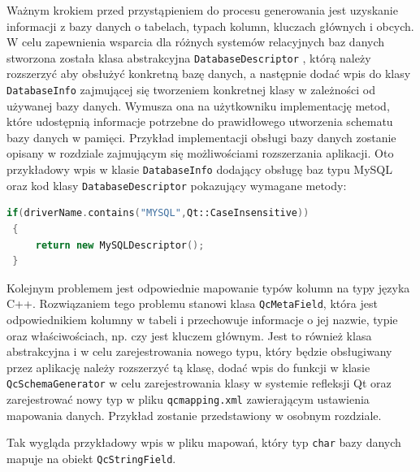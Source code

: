\documentclass[12pt]{report}
\let\oldaddcontentsline\addcontentsline
\newcommand{\lstinputcplusplus}[2][]{{%
  \renewcommand{\lstlistingname}{C++ Code}%
  \renewcommand{\addcontentsline}[3]{\oldaddcontentsline{loc}{##2}{##3}}%
}}
\begin{document}
Ważnym krokiem przed przystąpieniem do procesu generowania jest uzyskanie informacji z bazy danych o tabelach, typach kolumn, kluczach głównych i obcych. W celu zapewnienia wsparcia dla różnych systemów relacyjnych baz danych stworzona została klasa abstrakcyjna {\tt DatabaseDescriptor} , którą należy rozszerzyć aby obsłużyć konkretną bazę danych, a następnie dodać wpis do klasy {\tt DatabaseInfo} zajmującej się tworzeniem konkretnej klasy w zależności od używanej bazy danych. Wymusza ona na użytkowniku implementację metod, które udostępnią informacje potrzebne do prawidłowego utworzenia schematu bazy danych w pamięci. {\color{black} Przykład implementacji obsługi bazy danych zostanie opisany w rozdziale zajmującym się możliwościami rozszerzania aplikacji.} Oto przykładowy wpis w klasie {\tt DatabaseInfo} dodający obsługę baz typu MySQL oraz kod klasy {\tt DatabaseDescriptor} pokazujący wymagane metody:

\begin{framed}
\begin{lstlisting}[language=C++]
 if(driverName.contains("MYSQL",Qt::CaseInsensitive)) 
 {
     return new MySQLDescriptor();
 }
\end{lstlisting}
\end{framed}

\begin{framed}
\lstinputcplusplus[caption={DatabaseDescriptor}]{additional/databasedescriptor.h}
\end{framed}

Kolejnym problemem jest odpowiednie mapowanie typów kolumn na typy języ\-ka C++. Rozwiązaniem tego problemu stanowi klasa {\tt QcMetaField}, która jest odpowiednikiem kolumny w tabeli i przechowuje informacje o jej nazwie, typie oraz właściwościach, np. czy jest kluczem głównym. Jest to również klasa abstrakcyjna i w celu zarejestrowania nowego typu, który będzie obsługiwany przez aplikację należy rozszerzyć tą klasę, dodać wpis do funkcji w klasie {\tt QcSchemaGenerator} w celu zarejestrowania klasy w systemie refleksji Qt oraz zarejestrować nowy typ w pliku {\tt qcmapping.xml} zawierającym ustawienia mapowania danych. {\color{black} Przykład zostanie przedstawiony w osobnym rozdziale.}

\begin{framed}
\lstinputcplusplus[caption={QcMetaField}]{additional/qcmetafield.h}
\end{framed}

Tak wygląda przykładowy wpis w pliku mapowań, który typ {\tt char} bazy danych mapuje na obiekt {\tt QcStringField}. 
\end{document}
